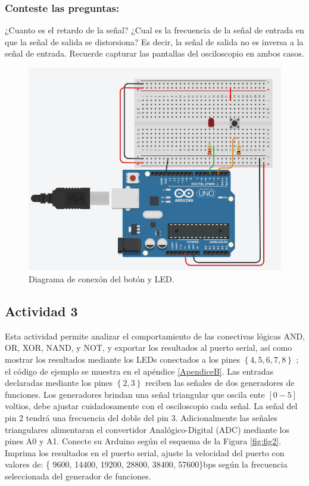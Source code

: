 \subsubsection{Conteste las preguntas:}
¿Cuanto es el retardo de la señal?
¿Cual es la frecuencia de la señal de entrada en que la señal de salida se distorsiona? Es decir, la señal de salida no es  inversa a la señal de entrada. Recuerde capturar las pantallas del osciloscopio en ambos casos.

\begin{figure}[H]
	\centering
	\includegraphics[width=0.5\linewidth]{Imagenes/Fig1}
	\caption{Diagrama de conexón del botón y LED.}
	\label{fig:fig1}
\end{figure}


\subsection{Actividad 3}

Esta actividad permite analizar el comportamiento de las conectivas lógicas  AND, OR, XOR, NAND, y NOT, y exportar los resultados al puerto serial, así como mostrar los resultados mediante los LEDs conectados a los pines $\left\lbrace4, 5, 6, 7, 8 \right\rbrace$ ; el código de ejemplo se muestra en el apéndice \ref{ApendiceB}. Las entradas declaradas mediante los pines $\left\lbrace2, 3 \right\rbrace$ reciben las señales de dos generadores de funciones. Los generadores brindan una señal triangular que oscila ente $[0-5]$ voltios, debe ajustar cuidadosamente con el osciloscopio cada señal. La señal del pin 2 tendrá una frecuencia del doble del pin 3. Adicionalmente las señales  triangulares alimentaran el convertidor Analógico-Digital (ADC) mediante los pines A0 y A1. Conecte su Arduino según el esquema de la Figura \ref{fig:fig2}.  Imprima los resultados en el puerto serial, ajuste la velocidad del puerto con valores de: \{ 9600, 14400, 19200, 28800, 38400, 57600\}bps según la frecuencia seleccionada del generador de funciones.

